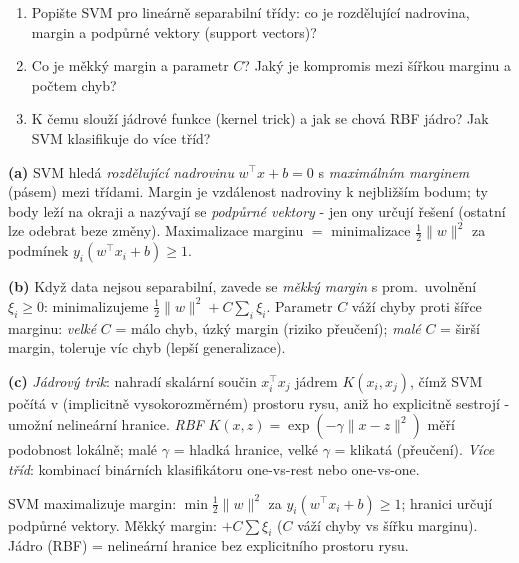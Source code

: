 \begin{zadani}
\begin{enumerate}[label=(\alph*)]
  \item {} Popište SVM pro lineárně separabilní třídy: co je rozdělující nadrovina, margin a podpůrné vektory (support vectors)?
  \item {} Co je měkký margin a parametr $C$? Jaký je kompromis mezi šířkou marginu a počtem chyb?
  \item {} K čemu slouží jádrové funkce (kernel trick) a jak se chová RBF jádro? Jak SVM klasifikuje do více tříd?
\end{enumerate}
\end{zadani}

\begin{reseni}
\textbf{(a)} SVM hledá \emph{rozdělující nadrovinu} $w^{\!\top}x+b=0$ s \emph{maximálním marginem} (pásem) mezi třídami. Margin je vzdálenost nadroviny k nejbližším bodum; ty body leží na okraji a nazývají se \emph{podpůrné vektory} - jen ony určují řešení (ostatní lze odebrat beze změny). Maximalizace marginu $=$ minimalizace $\tfrac12\lVert w\rVert^2$ za podmínek $y_i(w^{\!\top}x_i+b)\ge1$.

\textbf{(b)} Když data nejsou separabilní, zavede se \emph{měkký margin} s prom.\ uvolnění $\xi_i\ge0$: minimalizujeme $\tfrac12\lVert w\rVert^2+C\sum_i\xi_i$. Parametr $C$ váží chyby proti šířce marginu: \emph{velké} $C$ = málo chyb, úzký margin (riziko přeučení); \emph{malé} $C$ = širší margin, toleruje víc chyb (lepší generalizace).

\textbf{(c)} \emph{Jádrový trik}: nahradí skalární součin $x_i^{\!\top}x_j$ jádrem $K(x_i,x_j)$, čímž SVM počítá v (implicitně vysokorozměrném) prostoru rysu, aniž ho explicitně sestrojí - umožní nelineární hranice. \emph{RBF} $K(x,z)=\exp(-\gamma\lVert x-z\rVert^2)$ měří podobnost lokálně; malé $\gamma$ = hladká hranice, velké $\gamma$ = klikatá (přeučení). \emph{Více tříd}: kombinací binárních klasifikátoru one-vs-rest nebo one-vs-one.
\end{reseni}

\begin{jadro}
SVM maximalizuje margin: $\min\frac12\lVert w\rVert^2$ za $y_i(w^{\!\top}x_i+b)\ge1$; hranici určují podpůrné vektory. Měkký margin: $+C\sum\xi_i$ ($C$ váží chyby vs šířku marginu). Jádro (RBF) = nelineární hranice bez explicitního prostoru rysu.
\end{jadro}

